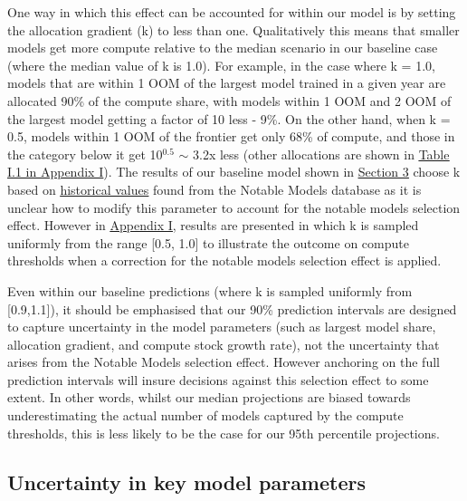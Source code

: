 \documentclass[11pt]{article}
\begin{document}
One way in which this effect can be accounted for within our model is by setting the allocation gradient (k) to less than one. Qualitatively this means that smaller models get more compute relative to the median scenario in our baseline case (where the median value of k is 1.0). For example, in the case where k = 1.0, models that are within 1 OOM of the largest model trained in a given year are allocated 90\% of the compute share, with models within 1 OOM and 2 OOM of the largest model getting a factor of 10 less - 9\%. On the other hand, when k = 0.5, models within 1 OOM of the frontier get only 68\% of compute, and those in the category below it get 10$^{0.5}$ $\sim$ 3.2x less (other allocations are shown in \underline{\hyperref[table-i.1---compute-allocations-for-various-k-1.-each-column-gives-the-allocation-for-a-particular-model-size-relative-to-the-largest-model-trained-in-a-given-year.-e.g-the-rightmost-column-shows-compute-allocations-for-models-within-1-oom-of-the-largest-model-size.]{Table I.1 in Appendix I}}). The results of our baseline model shown in \underline{\hyperref[results]{Section 3}} choose k based on \underline{\hyperref[appendix-d-historical-values-of-allocation-gradients]{historical values}} found from the Notable Models database as it is unclear how to modify this parameter to account for the notable models selection effect. However in \underline{\hyperref[appendix-i-results-for-varying-allocation-gradients]{Appendix I}}, results are presented in which k is sampled uniformly from the range [0.5, 1.0] to illustrate the outcome on compute thresholds when a correction for the notable models selection effect is applied.

Even within our baseline predictions (where k is sampled uniformly from [0.9,1.1]), it should be emphasised that our 90\% prediction intervals are designed to capture uncertainty in the model parameters (such as largest model share, allocation gradient, and compute stock growth rate), not the uncertainty that arises from the Notable Models selection effect. However anchoring on the full prediction intervals will insure decisions against this selection effect to some extent. In other words, whilst our median projections are biased towards underestimating the actual number of models captured by the compute thresholds, this is less likely to be the case for our 95th percentile projections.

\subsection{Uncertainty in key model parameters}
\end{document}
